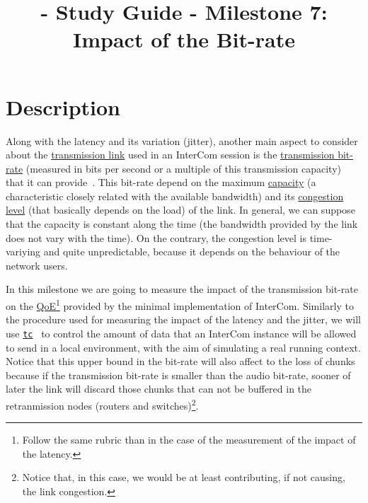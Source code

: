 
\title{\TM - Study Guide - Milestone 7: Impact of the Bit-rate}

\maketitle

\section{Description}

Along with the latency and its variation (jitter), another main aspect
to consider about the
\href{https://en.wikipedia.org/wiki/Telecommunications_link}{transmission
  link} used in an InterCom session is the
\href{https://en.wikipedia.org/wiki/Bit_rate}{transmission bit-rate}
(measured in bits per second or a multiple of this transmission
capacity) that it can provide~\cite{Forouzan,Tanenbaum}. This bit-rate
depend on the maximum
\href{https://en.wikipedia.org/wiki/Bandwidth_(computing)}{capacity}
(a characteristic closely related with the available bandwidth) and
its \href{https://en.wikipedia.org/wiki/Network_congestion}{congestion
  level} (that basically depends on the load) of the link. In general,
we can suppose that the capacity is constant along the time (the
bandwidth provided by the link does not vary with the time). On the
contrary, the congestion level is time-variying and quite
unpredictable, because it depends on the behaviour of the network
users.

In this milestone we are going to measure the impact of the
transmission bit-rate on the
\href{https://en.wikipedia.org/wiki/Quality_of_experience}{QoE}\footnote{Follow
  the same rubric than in the case of the measurement of the impact of
  the latency.} provided by the minimal implementation of InterCom. Similarly to the procedure used for measuring the impact of
the latency and the jitter, we will use
\href{https://man7.org/linux/man-pages/man8/tc.8.html}{\texttt{tc}}~\cite{bert2012lartc}
to control the amount of data that an InterCom instance will be
allowed to send in a local environment, with the aim of simulating a
real running context. Notice that this upper bound in the bit-rate
will also affect to the loss of chunks because if the transmission
bit-rate is smaller than the audio bit-rate, sooner of later the link
will discard those chunks that can not be buffered in the retranmission
nodes (routers and switches)\footnote{Notice that, in this case, we
would be at least contributing, if not causing, the link congestion.}.

